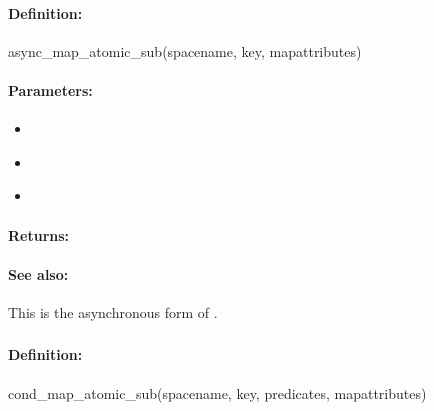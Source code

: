 \paragraph{Definition:}
\begin{rubycode}
async_map_atomic_sub(spacename, key, mapattributes)
\end{rubycode}

\paragraph{Parameters:}
\begin{itemize}[noitemsep]
\item {}\\

\item {}\\

\item {}\\

\end{itemize}

\paragraph{Returns:}


\paragraph{See also:}  This is the asynchronous form of .

\pagebreak
\subsubsection{}
\label{api:ruby:cond_map_atomic_sub}


\paragraph{Definition:}
\begin{rubycode}
cond_map_atomic_sub(spacename, key, predicates, mapattributes)
\end{rubycode}


